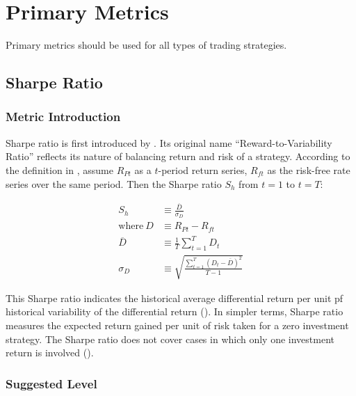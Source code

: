 \documentclass[12pt]{article}
\begin{document}
\section{Primary Metrics}

Primary metrics should be used for all types of trading strategies.

\subsection{Sharpe Ratio}

\subsubsection*{Metric Introduction}

Sharpe ratio is first introduced by \cite{sharpe1966}. Its original name \enquote{Reward-to-Variability Ratio} reflects its nature of balancing return and risk of a strategy. According to the definition in \cite{sharpe1994}, assume \(R_{Pt}\) as a \(t\)-period return series, \(R_{ft}\) as the risk-free rate series over the same period. Then the Sharpe ratio \(S_h\) from \(t=1\) to \(t=T\):

\begin{align*}
  S_h &\equiv \frac{\overline{D}}{\sigma_D} \\
  \text{where}~D &\equiv R_{Pt} - R_{ft} \\
  \overline{D} &\equiv \frac{1}{T} \sum_{t=1}^T D_t \\
  \sigma_D &\equiv \sqrt{\frac{\sum_{t=1}^T (D_t-\overline{D})^2}{T-1}}
\end{align*}

This Sharpe ratio indicates the historical average differential return per unit pf historical variability of the differential return (\cite{sharpe1966}). In simpler terms, Sharpe ratio measures the expected return gained per unit of risk taken for a zero investment strategy. The Sharpe ratio does not cover cases in which only one investment return is involved (\cite{sharpe1994}).

\subsubsection*{Suggested Level}
\end{document}
